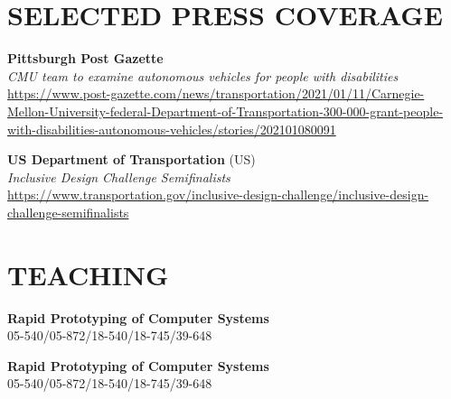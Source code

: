 \documentclass[11pt]{article} %
\begin{document}

\section*{SELECTED PRESS COVERAGE}
 \textbf{Pittsburgh Post Gazette}\\
\textit{CMU team to examine autonomous vehicles for people with disabilities}\\
\sloppy
\href{https://www.post-gazette.com/news/transportation/2021/01/11/Carnegie-Mellon-University-federal-Department-of-Transportation-300-000-grant-people-with-disabilities-autonomous-vehicles/stories/202101080091}{https://www.post-gazette.com/news/transportation/2021/01/11/Carnegie-Mellon-University-federal-Department-of-Transportation-300-000-grant-people-with-disabilities-autonomous-vehicles/stories/202101080091}
\medskip

 \textbf{US Department of Transportation} (US)\\
\textit{Inclusive Design Challenge Semifinalists}\\
\href{https://www.transportation.gov/inclusive-design-challenge/inclusive-design-challenge-semifinalists}{https://www.transportation.gov/inclusive-design-challenge/inclusive-design-challenge-semifinalists}


\section*{\uppercase{Teaching}}

 \textbf{Rapid Prototyping of Computer Systems}\\
05-540/05-872/18-540/18-745/39-648\\
\medskip

 \textbf{Rapid Prototyping of Computer Systems}\\
05-540/05-872/18-540/18-745/39-648\\

\end{document}

